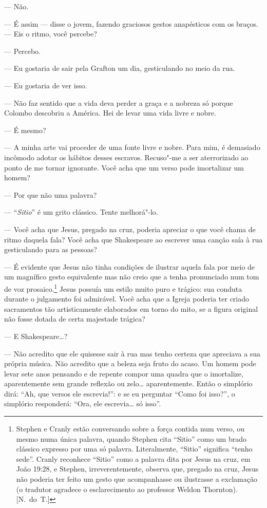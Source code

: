 --- Não.

--- É assim --- disse o jovem, fazendo graciosos gestos anapésticos com os
braços.  --- Eis o ritmo, você percebe?

--- Percebo.

--- Eu gostaria de sair pela Grafton um dia, gesticulando no meio da rua.

--- Eu gostaria de ver isso.

--- Não faz sentido que a vida deva perder a graça e a nobreza só porque
Colombo descobriu a América.  Hei de levar uma vida livre e nobre.

--- É mesmo?

--- A minha arte vai proceder de uma fonte livre e nobre.  Para mim, é
demasiado incômodo adotar os hábitos desses escravos.  Recuso"-me a ser
aterrorizado ao ponto de me tornar ignorante.  Você acha que um verso pode
imortalizar um homem?

--- Por que não uma palavra?

--- “\textit{Sitio}” é um grito clássico.  Tente melhorá"-lo.

--- Você acha que Jesus, pregado na cruz, poderia apreciar o que você chama de
ritmo daquela fala?  Você acha que Shakespeare ao escrever uma canção saía à
rua gesticulando para as pessoas?

--- É evidente que Jesus não tinha condições de ilustrar aquela fala por meio
de um magnífico gesto equivalente mas não creio que a tenha pronunciado num tom
de voz prosaico.\footnote{ Stephen e Cranly estão conversando sobre a força
contida num verso, ou mesmo numa única palavra, quando Stephen cita “Sitio”
como um brado clássico expresso por uma só palavra.  Literalmente, “Sitio”
significa “tenho sede”.  Cranly reconhece “Sitio” como a palavra dita por Jesus
na cruz, em João 19:28, e Stephen, irreverentemente, observa que, pregado na
cruz, Jesus não poderia ter feito um gesto que acompanhasse ou ilustrasse a
exclamação (o tradutor agradece o esclarecimento ao professor Weldon Thornton). [N.~do~T.]}
Jesus possuía um estilo muito puro e trágico: sua conduta durante o
julgamento foi admirável.  Você acha que a Igreja poderia ter criado
sacramentos tão artisticamente elaborados em torno do mito, se a figura
original não fosse dotada de certa majestade trágica?

--- E Shakespeare\ldots{}?

--- Não acredito que ele quisesse sair à rua mas tenho certeza que apreciava a
sua própria música.  Não acredito que a beleza seja fruto do acaso.  Um homem
pode levar sete anos pensando e de repente compor uma quadra que o imortalize,
aparentemente sem grande reflexão ou zelo\ldots{} aparentemente.  Então o simplório
dirá: “Ah, que versos ele escrevia!”: e se eu perguntar “Como foi isso?”, o
simplório responderá: “Ora, ele escrevia\ldots{} só isso”.

